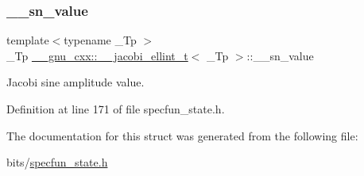 \subsubsection{\texorpdfstring{\+\_\+\+\_\+sn\+\_\+value}{\_\_sn\_value}}
{\footnotesize\ttfamily template$<$typename \+\_\+\+Tp $>$ \\
\+\_\+\+Tp \hyperlink{struct____gnu__cxx_1_1____jacobi__ellint__t}{\+\_\+\+\_\+gnu\+\_\+cxx\+::\+\_\+\+\_\+jacobi\+\_\+ellint\+\_\+t}$<$ \+\_\+\+Tp $>$\+::\+\_\+\+\_\+sn\+\_\+value}



Jacobi sine amplitude value. 



Definition at line 171 of file specfun\+\_\+state.\+h.



The documentation for this struct was generated from the following file\+:\begin{DoxyCompactItemize}
\item 
bits/\hyperlink{specfun__state_8h}{specfun\+\_\+state.\+h}\end{DoxyCompactItemize}
